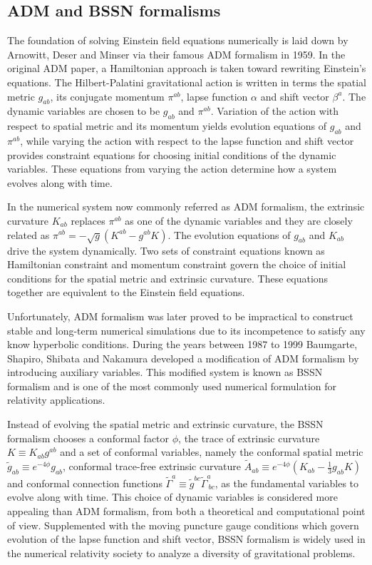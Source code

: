 \subsection{ADM and BSSN formalisms}
The foundation of solving Einstein field equations numerically is laid down by Arnowitt, Deser and Minser via their famous ADM formalism\cite{ADM:Witten} in 1959. In the original ADM paper, a Hamiltonian approach is taken toward rewriting Einstein's equations. The Hilbert-Palatini gravitational action is written in terms the spatial metric $g_{ab}$, its conjugate momentum $\pi^{ab}$, lapse function $\alpha$ and shift vector $\beta^{a}$. The dynamic variables are chosen to be $g_{ab}$ and $\pi^{ab}$. Variation of the action with respect to spatial metric and its momentum yields evolution equations of $g_{ab}$ and $\pi^{ab}$, while varying the action with respect to the lapse function and shift vector provides constraint equations for choosing initial conditions of the dynamic variables. These equations from varying the action determine how a system evolves along with time. 

In the numerical system now commonly referred as ADM formalism, the extrinsic curvature $K_{ab}$ replaces $\pi^{ab}$ as one of the dynamic variables and they are closely related as $\pi^{ab} = -\sqrt{g}(K^{ab} - g^{ab}K)$. The evolution equations of $g_{ab}$ and $K_{ab}$ drive the system dynamically. Two sets of constraint equations known as Hamiltonian constraint and momentum constraint govern the choice of initial conditions for the spatial metric and extrinsic curvature. These equations together are equivalent to the Einstein field equations. 

Unfortunately, ADM formalism was later proved to be impractical to construct stable and long-term numerical simulations due to its incompetence to satisfy any know hyperbolic conditions. During the years between 1987 to 1999 Baumgarte, Shapiro, Shibata and Nakamura\cite{Shibata:1995we, Baumgarte:1998te} developed a modification of ADM formalism by introducing auxiliary variables. This modified system is known as BSSN formalism and is one of the most commonly used numerical formulation for relativity applications. 

Instead of evolving the spatial metric and extrinsic curvature, the BSSN formalism chooses a conformal factor $\phi$, the trace of extrinsic curvature $K \equiv K_{ab}g^{ab}$ and a set of conformal variables, namely the conformal spatial metric ${\tilde g}_{ab} \equiv e^{-4\phi}g_{ab}$, conformal trace-free extrinsic curvature ${\tilde A}_{ab} \equiv e^{-4\phi}(K_{ab} - \frac{1}{3}g_{ab}K)$ and conformal connection functions ${\tilde \Gamma}^{a} \equiv {\tilde g}^{bc}{\tilde \Gamma}^{a}_{~bc}$, as the fundamental variables to evolve along with time. This choice of dynamic variables is considered more appealing than ADM formalism, from both a theoretical and computational point of view. Supplemented with the moving puncture gauge conditions which govern evolution of the lapse function and shift vector, BSSN formalism is widely used in the numerical relativity society to analyze a diversity of gravitational problems. 

